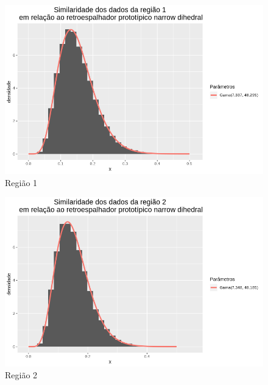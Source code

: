 \documentclass[12pt]{article}
\begin{document}
\begin{figure}[!h]
    \centering
    \includegraphics[width = \linewidth]{../../Images/Report_18_12_20/nd_region1.png}
    \caption{Região 1}
    \label{fig:nd_r1}
\end{figure}

\begin{figure}[!h]
    \centering
    \includegraphics[width = \linewidth]{../../Images/Report_18_12_20/nd_region2.png}
    \caption{Região 2}
    \label{fig:nd_r2}
\end{figure}
\end{document}
